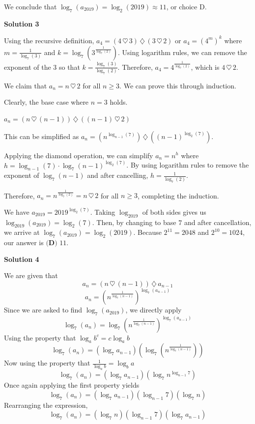 \begin{enumerate}
 We conclude that $\log_7(a_{2019}) = \log_2(2019) \approx \boxed{11}$, or choice $\boxed{\text{D}}$.

 



\textbf{Solution 3}

Using the recursive definition, $a_4 = (4  \, \heartsuit \, 3) \, \diamondsuit\, (3 \, \heartsuit\, 2)$ or $a_4 = (4^{m})^{k}$ where $m = \frac{1}{\log_{7}(3)}$ and $k = \log_{7}(3^{\frac{1}{\log_{7}(2)}})$. Using logarithm rules, we can remove the exponent of the 3 so that $k = \frac{\log_{7}(3)}{\log_{7}(2)}$. Therefore, $a_4 = 4^{\frac{1}{\log_{7}(2)}}$, which is $4  \, \heartsuit \, 2$.

 We claim that $a_n = n  \, \heartsuit \, 2$ for all $n \geq 3$. We can prove this through induction.

 Clearly, the base case where $n = 3$ holds.

 $a_n = (n\, \heartsuit\, (n-1)) \,\diamondsuit\, ((n-1)  \, \heartsuit \, 2)$

 This can be simplified as $a_n = (n^{\log_{n-1}(7)}) \, \diamondsuit \, ((n-1)^{\log_{2}(7)})$.

 Applying the diamond operation, we can simplify $a_n = n^h$ where $h = \log_{n-1}(7) \cdot \log_{7}(n-1)^{\log_{2}(7)}$. By using logarithm rules to remove the exponent of $\log_{7}(n-1)$ and after cancelling, $h = \frac{1}{\log_{7}(2)}$.

 Therefore, $a_n = n^{\frac{1}{\log_{7}(2)}} = n  \, \heartsuit \, 2$ for all $n \geq 3$, completing the induction.

 We have $a_{2019} = 2019^{\log_{2}(7)}$. Taking $\log_{2019}$ of both sides gives us ${\log_{2019}(a_{2019})} = {\log_{2}(7)}$. Then, by changing to base $7$ and after cancellation, we arrive at ${\log_{7}(a_{2019})} = {\log_{2}(2019)}$. Because $2^{11} = 2048$ and $2^{10} = 1024$, our answer is $\boxed{\textbf{(D) } 11}$.

 



\textbf{Solution 4}

We are given that 
 \[a_n=(n\, \heartsuit\, (n-1)) \,\diamondsuit\, a_{n-1}\]
 \[a_n=(n^{\frac{1}{\log_7(n-1)}})^{\log_7(a_{n-1})}\]Since we are asked to find $\log_7(a_{2019})$, we directly apply
 \[\log_7(a_n)=\log_7(n^{\frac{1}{\log_7(n-1)}})^{\log_7(a_{n-1})}\]Using the property that $\log_ab^c=c\log_ab$
 \[\log_7(a_n)=(\log_7a_{n-1})(\log_7(n^{\frac{1}{\log_7(n-1)}}))\]Now using the property that $\frac{1}{\log_ab}=\log_ba$
 \[\log_7(a_n)=(\log_7a_{n-1})(\log_7n^{\log_{n-1}7})\]Once again applying the first property yields
 \[\log_7(a_n)=(\log_7a_{n-1})(\log_{n-1}7)(\log_7n)\]Rearranging the expression,
 \[\log_7(a_n)=(\log_7n)(\log_{n-1}7)(\log_7a_{n-1})\]


\end{enumerate}
